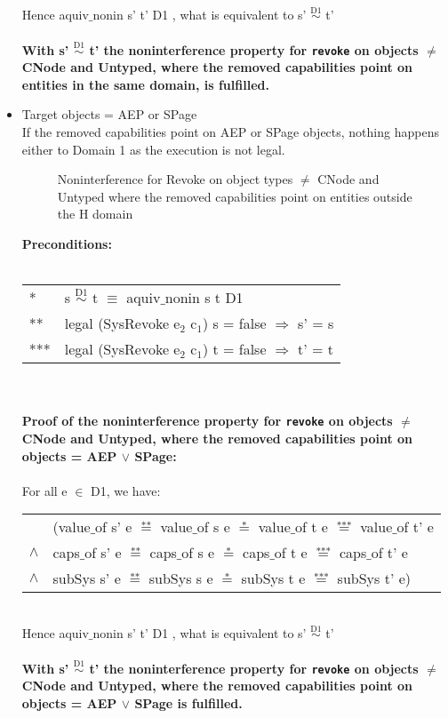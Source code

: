 \begin{itemize}
Hence aquiv$\_$nonin s' t' D1 , what is equivalent to s' $\overset{\text{D1}}{\sim}$ t'\\ \\ 
\textbf{With s' $\overset{\text{D1}}{\sim}$ t' the noninterference property for \texttt{revoke} on objects $\neq$ CNode and Untyped, where the removed capabilities point on entities in the same domain, is fulfilled.}  
\item Target objects = AEP or SPage \\
If the removed capabilities point on AEP or SPage objects, nothing happens either to Domain 1 as the execution is not legal. 
\begin{figure}[H]
\caption{Noninterference for Revoke on object types $\neq$ CNode and Untyped where the removed capabilities point on entities outside the H domain}
\label{fig:RevokeOutside2}
\end{figure}
\textbf{Preconditions:} \\ \\
\begin{tabular}{ll}
* & s $\overset{\text{D1}}{\sim}$ t $\equiv$ aquiv$\_$nonin s t D1	\\ 
** & legal (SysRevoke e$_2$ c$_1$) s = false $\Rightarrow$ s' = s \\ 
*** & legal (SysRevoke e$_2$ c$_1$) t = false $\Rightarrow$ t' = t
\end{tabular} \\ \\ 
\textbf{Proof of the noninterference property for \texttt{revoke} on objects $\neq$ CNode and Untyped, where the removed capabilities point on objects = AEP $\vee$ SPage:}\\ \\
For all e $\in$ D1, we have: \\ 
\begin{tabular}{ll}
& (value$\_$of s' e $\overset{\text{**}}{=}$ value$\_$of s e $\overset{\text{*}}{=}$ value$\_$of t e $\overset{\text{***}}{=}$ value$\_$of t' e \\
$\wedge$ & caps$\_$of s' e $\overset{\text{**}}{=}$ caps$\_$of s e $\overset{\text{*}}{=}$ caps$\_$of t e $\overset{\text{***}}{=}$ caps$\_$of t' e \\
$\wedge$ & subSys s' e $\overset{\text{**}}{=}$ subSys s e $\overset{\text{*}}{=}$ subSys t e $\overset{\text{***}}{=}$ subSys t' e)
\end{tabular} \\
Hence aquiv$\_$nonin s' t' D1 , what is equivalent to s' $\overset{\text{D1}}{\sim}$ t'\\ \\ 
\textbf{With s' $\overset{\text{D1}}{\sim}$ t' the noninterference property for \texttt{revoke} on objects $\neq$ CNode and Untyped, where the removed capabilities point on objects = AEP $\vee$ SPage is fulfilled.}  
\end{itemize}
